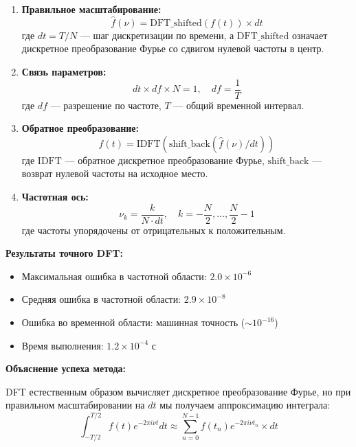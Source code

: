 \begin{enumerate}
    \item \textbf{Правильное масштабирование:}
    \begin{equation}
    \hat{f}(\nu) = \text{DFT\_shifted}(f(t)) \times dt
    \end{equation}
    где $dt = T/N$ — шаг дискретизации по времени, а $\text{DFT\_shifted}$ означает дискретное преобразование Фурье со сдвигом нулевой частоты в центр.

    \item \textbf{Связь параметров:}
    \begin{equation}
    dt \times df \times N = 1, \quad df = \frac{1}{T}
    \end{equation}
    где $df$ — разрешение по частоте, $T$ — общий временной интервал.

    \item \textbf{Обратное преобразование:}
    \begin{equation}
    f(t) = \text{IDFT}(\text{shift\_back}(\hat{f}(\nu)/dt))
    \end{equation}
    где $\text{IDFT}$ — обратное дискретное преобразование Фурье, $\text{shift\_back}$ — возврат нулевой частоты на исходное место.

    \item \textbf{Частотная ось:}
    \begin{equation}
    \nu_k = \frac{k}{N \cdot dt}, \quad k = -\frac{N}{2}, \ldots, \frac{N}{2}-1
    \end{equation}
    где частоты упорядочены от отрицательных к положительным.
\end{enumerate}

\textbf{Результаты точного DFT:}
\begin{itemize}
    \item Максимальная ошибка в частотной области: $2.0 \times 10^{-6}$
    \item Средняя ошибка в частотной области: $2.9 \times 10^{-8}$
    \item Ошибка во временной области: машинная точность ($\sim 10^{-16}$)
    \item Время выполнения: $1.2 \times 10^{-4}$ с
\end{itemize}

\textbf{Объяснение успеха метода:}

DFT естественным образом вычисляет дискретное преобразование Фурье, но при правильном масштабировании на $dt$ мы получаем аппроксимацию интеграла:
\begin{equation}
\int_{-T/2}^{T/2} f(t) e^{-2\pi i \nu t} dt \approx \sum_{n=0}^{N-1} f(t_n) e^{-2\pi i \nu t_n} \times dt
\end{equation}

